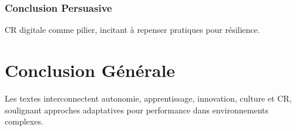 \documentclass[11pt]{rapportECL}
\begin{document}
\subsubsection{Conclusion Persuasive}
CR digitale comme pilier, incitant à repenser pratiques pour résilience.

\section{Conclusion Générale}
Les textes interconnectent autonomie, apprentissage, innovation, culture et CR, soulignant approches adaptatives pour performance dans environnements complexes.
\end{document}
